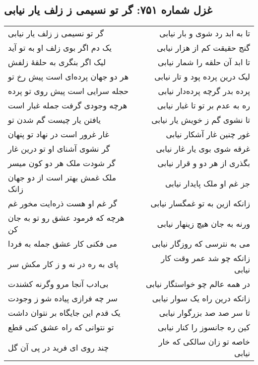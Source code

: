 \begin{center}
\section*{غزل شماره ۷۵۱: گر تو نسیمی ز زلف یار نیابی}
\label{sec:751}
\begin{longtable}{l p{0.5cm} r}
گر تو نسیمی ز زلف یار نیابی
&&
تا به ابد رد شوی و بار نیابی
\\
یک دم اگر بوی زلف او به تو آید
&&
گنج حقیقت کم از هزار نیابی
\\
لیک اگر بنگری به حلقهٔ زلفش
&&
تا ابد آن حلقه را شمار نیابی
\\
هر دو جهان پرده‌ای است پیش رخ تو
&&
لیک درین پرده پود و تار نیابی
\\
حجله سرایی است پیش روی تو پرده
&&
پرده بدر گرچه پرده‌دار نیابی
\\
هرچه وجودی گرفت جمله غبار است
&&
ره به عدم بر تو تا غبار نیابی
\\
یافتن یار چیست گم شدن تو
&&
تا نشوی گم ز خویش یار نیابی
\\
غار غرور است در نهاد تو پنهان
&&
غور چنین غار آشکار نیابی
\\
گر نشوی آشنای او تو درین غار
&&
غرقه شوی بوی یار غار نیابی
\\
گر شودت ملک هر دو کون میسر
&&
بگذری از هر دو و قرار نیابی
\\
ملک غمش بهتر است از دو جهان زانک
&&
جز غم او ملک پایدار نیابی
\\
گر غم او هست ذره‌ایت مخور غم
&&
زانکه ازین به تو غمگسار نیابی
\\
هرچه که فرمود عشق رو تو به جان کن
&&
ورنه به جان هیچ زینهار نیابی
\\
می فکنی کار عشق جمله به فردا
&&
می به نترسی که روزگار نیابی
\\
پای به ره در نه و ز کار مکش سر
&&
زانکه چو شد عمر وقت کار نیابی
\\
بی‌ادب آنجا مرو وگرنه کشندت
&&
در همه عالم چو خواستگار نیابی
\\
سر چه فرازی پیاده شو ز وجودت
&&
زانکه درین راه یک سوار نیابی
\\
یک قدم این جایگاه بر نتوان داشت
&&
تا سر صد صد بزرگوار نیابی
\\
تو نتوانی که راه عشق کنی قطع
&&
کین ره جانسوز را کنار نیابی
\\
چند روی ای فرید در پی آن گل
&&
خاصه تو زان سالکی که خار نیابی
\\
\end{longtable}
\end{center}
